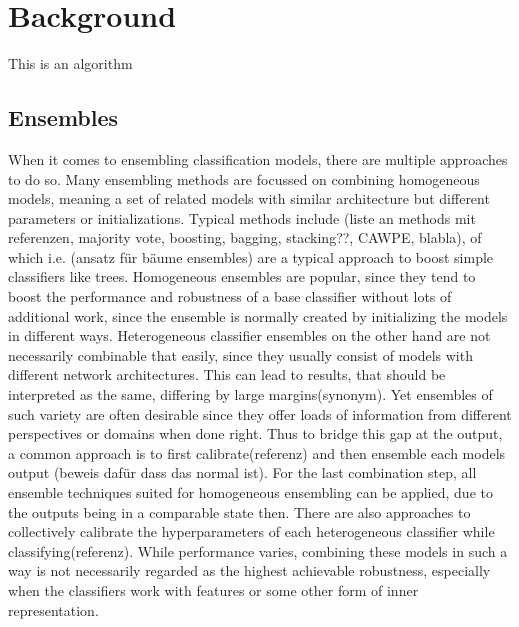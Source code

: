 \chapter{Background}
\label{chap:background}
This is an algorithm 



\section{Ensembles}

When it comes to ensembling classification models, there are multiple approaches to do so. Many ensembling methods are focussed on combining homogeneous 
models, meaning a set of related models with similar architecture but different parameters or initializations. Typical methods include 
(liste an methods mit referenzen, majority vote, boosting, bagging, stacking??, CAWPE, blabla), of which i.e. (ansatz für bäume ensembles) are a typical approach to boost simple 
classifiers like trees. Homogeneous ensembles are popular, since they tend to boost the performance and robustness of a base classifier without lots 
of additional work, since the ensemble is normally created by initializing the models in different ways.
Heterogeneous classifier ensembles on the other hand are not necessarily combinable that easily, since they usually consist of models with 
different network architectures. This can lead to results, that should be interpreted as the same, differing by large margins(synonym). Yet 
ensembles of such variety are often desirable since they offer loads of information from different perspectives or domains when done right. 
Thus to bridge this gap at the output, a common approach is to first calibrate(referenz) and then ensemble each models 
output (beweis dafür dass das normal ist). For the last combination step, all ensemble techniques suited for homogeneous ensembling can 
be applied, due to the outputs being in a comparable state then. There are also approaches to collectively calibrate the hyperparameters 
of each heterogeneous classifier while classifying(referenz). While performance varies, combining 
these models in such a way is not necessarily regarded as the highest achievable robustness, especially when the classifiers work with features or some other form of inner representation. 
